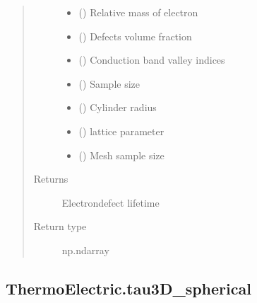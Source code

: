 \documentclass[letterpaper,10pt,english]{sphinxmanual}
\begin{document}
\begin{fulllineitems}
\begin{quote}
\begin{description}
\begin{itemize}
\item {} 
\sphinxAtStartPar
{} () \textendash{} Relative mass of electron

\item {} 
\sphinxAtStartPar
{} () \textendash{} Defects volume fraction

\item {} 
\sphinxAtStartPar
{} () \textendash{} Conduction band valley indices

\item {} 
\sphinxAtStartPar
{} () \textendash{} Sample size

\item {} 
\sphinxAtStartPar
{} () \textendash{} Cylinder radius

\item {} 
\sphinxAtStartPar
{} () \textendash{} lattice parameter

\item {} 
\sphinxAtStartPar
{} () \textendash{} Mesh sample size

\end{itemize}

\item[{Returns}] \leavevmode
\sphinxAtStartPar
{} \textendash{} Electron\sphinxhyphen{}defect lifetime

\item[{Return type}] \leavevmode
\sphinxAtStartPar
np.ndarray

\end{description}\end{quote}

\end{fulllineitems}



\subsection{ThermoElectric.tau3D\_spherical}
\label{\detokenize{autosummary/ThermoElectric.tau3D_spherical:thermoelectric-tau3d-spherical}}\label{\detokenize{autosummary/ThermoElectric.tau3D_spherical::doc}}
\end{document}
